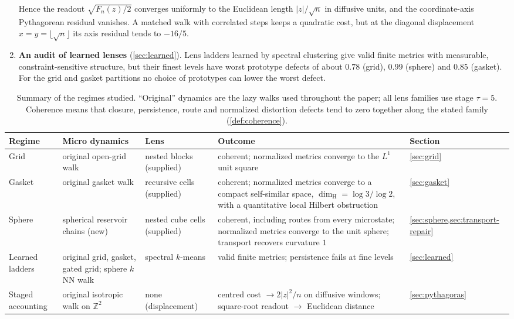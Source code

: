 \documentclass[11pt]{article}
\newcommand{\Z}{\mathbb{Z}}
\newcommand{\dH}{\dim_{\mathrm{H}}}
\begin{document}
\begin{enumerate}[leftmargin=*]
Hence the readout $\sqrt{F_n(z)/2}$ converges uniformly to the Euclidean length $|z|/\sqrt n$ in diffusive units, and the coordinate-axis Pythagorean residual vanishes.
A matched walk with correlated steps keeps a quadratic cost, but at the diagonal displacement $x=y=\lfloor\sqrt n\rfloor$ its axis residual tends to $-16/5$.
\item \textbf{An audit of learned lenses} (\cref{sec:learned}).
Lens ladders learned by spectral clustering give valid finite metrics with measurable, constraint-sensitive structure, but their finest levels have worst prototype defects of about $0.78$ (grid), $0.99$ (sphere) and $0.85$ (gasket).
For the grid and gasket partitions no choice of prototypes can lower the worst defect.
\end{enumerate}

\begin{table}[t]
\centering
\small
\caption{Summary of the regimes studied. ``Original'' dynamics are the lazy walks used throughout the paper; all lens families use stage $\tau=5$. Coherence means that closure, persistence, route and normalized distortion defects tend to zero together along the stated family (\cref{def:coherence}).}
\label{tab:summary}
\begin{tabularx}{\textwidth}{@{}>{\raggedright\arraybackslash}p{}>{\raggedright\arraybackslash}p{}>{\raggedright\arraybackslash}p{}>{\raggedright\arraybackslash}X>{\raggedright\arraybackslash}p{}@{}}
\toprule
Regime & Micro dynamics & Lens & Outcome & Section \\
\midrule
Grid & original open-grid walk & nested blocks (supplied) & coherent; normalized metrics converge to the $L^1$ unit square & \cref{sec:grid} \\
Gasket & original gasket walk & recursive cells (supplied) & coherent; normalized metrics converge to a compact self-similar space, $\dH=\log 3/\log 2$, with a quantitative local Hilbert obstruction & \cref{sec:gasket} \\
Sphere & spherical reservoir chains (new) & nested cube cells (supplied) & coherent, including routes from every microstate; normalized metrics converge to the unit sphere; transport recovers curvature $1$ & \cref{sec:sphere,sec:transport-repair} \\
Learned ladders & original grid, gasket, gated grid; sphere $k$NN walk & spectral $k$-means & valid finite metrics; persistence fails at fine levels & \cref{sec:learned} \\
Staged accounting & original isotropic walk on $\Z^2$ & none (displacement) & centred cost $\to2|z|^2/n$ on diffusive windows; square-root readout $\to$ Euclidean distance & \cref{sec:pythagoras} \\
\bottomrule
\end{tabularx}
\end{table}
\end{document}
